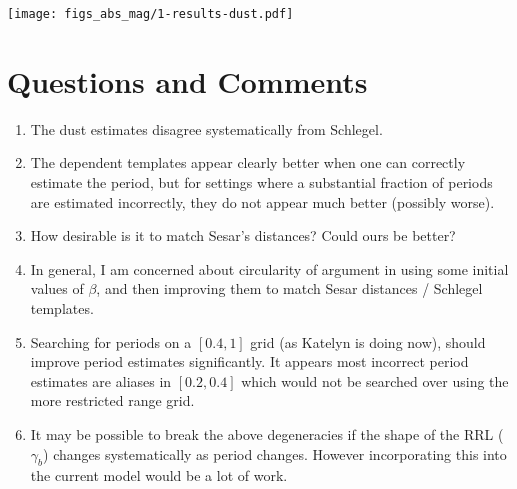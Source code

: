 \documentclass[12pt]{article}
\begin{document}
\begin{center}
  \texttt{[image: figs\_abs\_mag/1-results-dust.pdf]}
\end{center}









\section{Questions and Comments}
\label{sec:questions}

\begin{enumerate}
\item The dust estimates disagree systematically from Schlegel.
\item The dependent templates appear clearly better when one can correctly estimate the period, but for settings where a substantial fraction of periods are estimated incorrectly, they do not appear much better (possibly worse).
\item How desirable is it to match Sesar's distances? Could ours be better?
\item In general, I am concerned about circularity of argument in using some initial values of $\beta$, and then improving them to match Sesar distances / Schlegel templates.
\item Searching for periods on a $[0.4,1]$ grid (as Katelyn is doing now), should improve period estimates significantly. It appears most incorrect period estimates are aliases in $[0.2,0.4]$ which would not be searched over using the more restricted range grid.
\item It may be possible to break the above degeneracies if the shape of the RRL ($\gamma_b$) changes systematically as period changes. However incorporating this into the current model would be a lot of work.
\end{enumerate}



%
%
\end{document}
